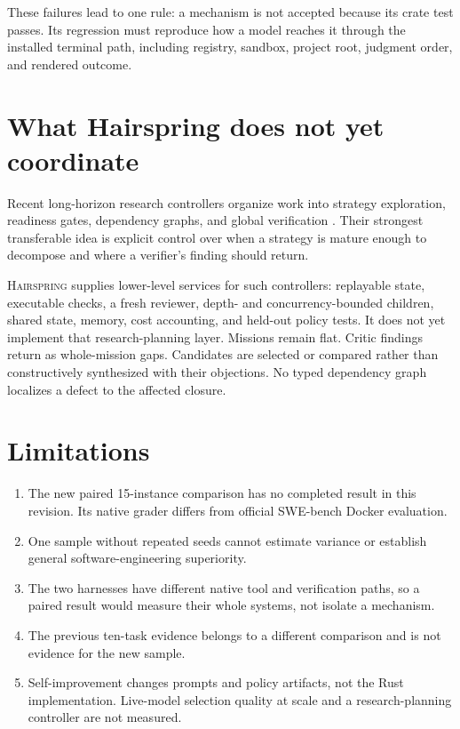\documentclass[10pt,letterpaper]{article}
\newcommand{\system}{\textsc{Hairspring}}
\begin{document}
These failures lead to one rule: a mechanism is not accepted because its crate test passes. Its regression must reproduce how a model reaches it through the installed terminal path, including registry, sandbox, project root, judgment order, and rendered outcome.

\section{What Hairspring does not yet coordinate}
Recent long-horizon research controllers organize work into strategy exploration, readiness gates, dependency graphs, and global verification \cite{colosseum}. Their strongest transferable idea is explicit control over when a strategy is mature enough to decompose and where a verifier's finding should return.

\system{} supplies lower-level services for such controllers: replayable state, executable checks, a fresh reviewer, depth- and concurrency-bounded children, shared state, memory, cost accounting, and held-out policy tests. It does not yet implement that research-planning layer. Missions remain flat. Critic findings return as whole-mission gaps. Candidates are selected or compared rather than constructively synthesized with their objections. No typed dependency graph localizes a defect to the affected closure.

\section{Limitations}
\begin{enumerate}
\item The new paired 15-instance comparison has no completed result in this revision. Its native grader differs from official SWE-bench Docker evaluation.
\item One sample without repeated seeds cannot estimate variance or establish general software-engineering superiority.
\item The two harnesses have different native tool and verification paths, so a paired result would measure their whole systems, not isolate a mechanism.
\item The previous ten-task evidence belongs to a different comparison and is not evidence for the new sample.
\item Self-improvement changes prompts and policy artifacts, not the Rust implementation. Live-model selection quality at scale and a research-planning controller are not measured.
\end{enumerate}
\end{document}
